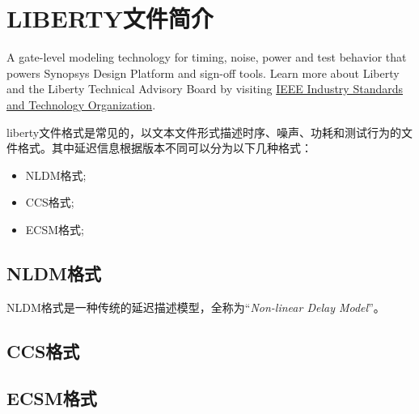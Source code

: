 \section{LIBERTY文件简介}
A gate-level modeling technology for timing, noise, power and test behavior that powers Synopsys Design Platform and sign-off tools. Learn more about Liberty and the Liberty Technical Advisory Board by visiting \href{http://ieee-isto.org/member_programs/liberty-technical-advisory-board/}{IEEE Industry Standards and Technology Organization}.

liberty文件格式是常见的，以文本文件形式描述时序、噪声、功耗和测试行为的文件格式。其中延迟信息根据版本不同可以分为以下几种格式：
\begin{itemize}
\item NLDM格式;
\item CCS格式;
\item ECSM格式;
\end{itemize}

\subsection{NLDM格式}
NLDM格式是一种传统的延迟描述模型，全称为“\textit{Non-linear Delay Model}”。
\subsection{CCS格式}

\subsection{ECSM格式}
